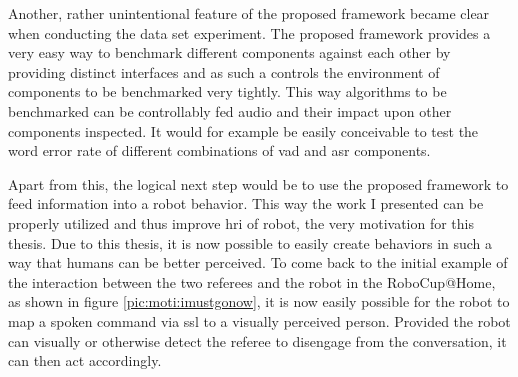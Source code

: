 Another, rather unintentional feature of the proposed framework became clear when conducting the data set experiment.
The proposed framework provides a very easy way to benchmark different components against each other by providing distinct interfaces and as such a controls the environment of components to be benchmarked very tightly.
This way algorithms to be benchmarked can be controllably fed audio and their impact upon other components inspected.
It would for example be easily conceivable to test the word error rate of different combinations of \gls{vad} and \gls{asr} components.

Apart from this, the logical next step would be to use the proposed framework to feed information into a robot behavior.
This way the work I presented can be properly utilized and thus improve \gls{hri} of robot, the very motivation for this thesis.
Due to this thesis, it is now possible to easily create behaviors in such a way that humans can be better perceived.
To come back to the initial example of the interaction between the two referees and the robot in the RoboCup@Home, as shown in figure \ref{pic:moti:imustgonow}, it is now easily possible for the robot to map a spoken command via \gls{ssl} to a visually perceived person.
Provided the robot can visually or otherwise detect the referee to disengage from the conversation, it can then act accordingly.


